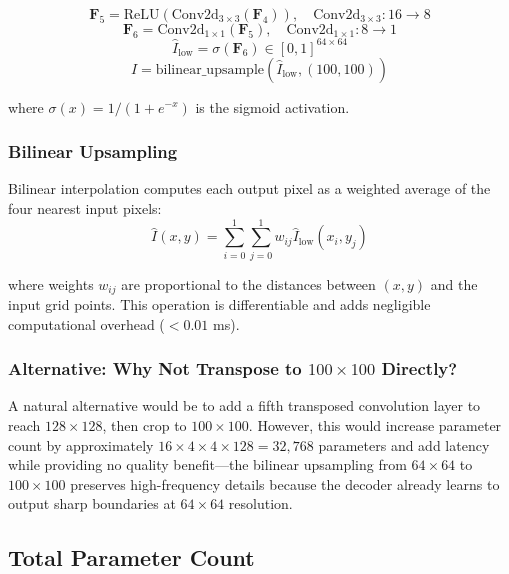 ﻿\documentclass[12pt,a4paper,oneside]{report}
\begin{document}
\begin{equation}
\mathbf{F}_5 = \text{ReLU}(\text{Conv2d}_{3\times3}(\mathbf{F}_4)), \quad \text{Conv2d}_{3\times3}: 16 \rightarrow 8
\end{equation}
\begin{equation}
\mathbf{F}_6 = \text{Conv2d}_{1\times1}(\mathbf{F}_5), \quad \text{Conv2d}_{1\times1}: 8 \rightarrow 1
\end{equation}
\begin{equation}
\hat{I}_{\text{low}} = \sigma(\mathbf{F}_6) \in [0, 1]^{64 \times 64}
\end{equation}
\begin{equation}
\hat{I} = \text{bilinear\_upsample}(\hat{I}_{\text{low}}, (100, 100))
\end{equation}

where $\sigma(x) = 1/(1 + e^{-x})$ is the sigmoid activation.

\subsubsection{Bilinear Upsampling}

Bilinear interpolation computes each output pixel as a weighted average of the four nearest input pixels:
\begin{equation}
\hat{I}(x,y) = \sum_{i=0}^{1}\sum_{j=0}^{1} w_{ij} \hat{I}_{\text{low}}(x_i, y_j)
\end{equation}

where weights $w_{ij}$ are proportional to the distances between $(x,y)$ and the input grid points. This operation is differentiable and adds negligible computational overhead ($<0.01$ ms).

\subsubsection{Alternative: Why Not Transpose to $100 \times 100$ Directly?}

A natural alternative would be to add a fifth transposed convolution layer to reach $128 \times 128$, then crop to $100 \times 100$. However, this would increase parameter count by approximately $16 \times 4 \times 4 \times 128 = 32,768$ parameters and add latency while providing no quality benefit---the bilinear upsampling from $64 \times 64$ to $100 \times 100$ preserves high-frequency details because the decoder already learns to output sharp boundaries at $64 \times 64$ resolution.

\subsection{Total Parameter Count}
\end{document}
